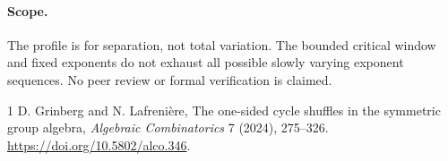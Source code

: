 \documentclass[11pt]{article}
\begin{document}
\paragraph{Scope.} The profile is for separation, not total variation. The bounded critical window and fixed exponents do not exhaust all possible slowly varying exponent sequences. No peer review or formal verification is claimed.
\begin{thebibliography}{1}
 D. Grinberg and N. Lafrenière, The one-sided cycle shuffles in the symmetric group algebra, \emph{Algebraic Combinatorics} 7 (2024), 275--326. \url{https://doi.org/10.5802/alco.346}.
\end{thebibliography}
\end{document}
